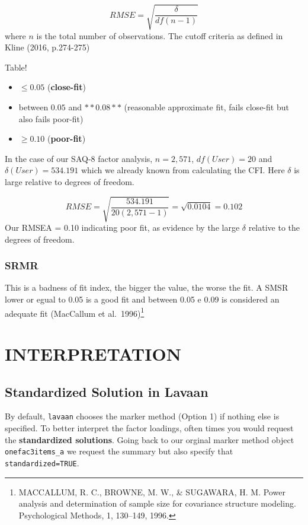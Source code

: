 \documentclass[
]{article}
\providecommand{\tightlist}{%
  \setlength{\itemsep}{0pt}\setlength{\parskip}{0pt}}
\begin{document}
\[
RMSE = \sqrt{\frac{\delta}{df(n-1)}}
\] where \(n\) is the total number of observations. The cutoff criteria
as defined in Kline (2016, p.274-275)

Table!

\begin{itemize}
\tightlist
\item
  \(\leq 0.05\) (\textbf{close-fit})
\item
  between \(0.05\) and \(**0.08**\) (reasonable approximate fit, fails
  close-fit but also fails poor-fit)
\item
  \(\geq 0.10\) (\textbf{poor-fit})
\end{itemize}

In the case of our SAQ-8 factor analysis, \(n=2,571\), \(df(User)=20\)
and \(\delta (User)=534.191\) which we already known from calculating
the CFI. Here \(\delta\) is large relative to degrees of freedom.

\[
RMSE = \sqrt{\frac{534.191}{20(2,571-1)}}=\sqrt{0.0104}=0.102
\] Our RMSEA = 0.10 indicating poor fit, as evidence by the large
\(\delta\) relative to the degrees of freedom.

\hypertarget{srmr}{%
\subsubsection{SRMR}\label{srmr}}

This is a badness of fit index, the bigger the value, the worse the fit.
A SMSR lower or egual to 0.05 is a good fit and between 0.05 e 0.09 is
considered an adequate fit (MacCallum et al.~1996)\footnote{MACCALLUM,
  R. C., BROWNE, M. W., \& SUGAWARA, H. M. Power analysis and
  determination of sample size for covariance structure modeling.
  Psychological Methods, 1, 130--149, 1996.}

\hypertarget{interpretation}{%
\section{INTERPRETATION}\label{interpretation}}

\hypertarget{standardized-solution-in-lavaan}{%
\subsection{Standardized Solution in
Lavaan}\label{standardized-solution-in-lavaan}}

By default, \texttt{lavaan} chooses the marker method (Option 1) if
nothing else is specified. To better interpret the factor loadings,
often times you would request the \textbf{standardized solutions}. Going
back to our orginal marker method object \texttt{onefac3items\_a} we
request the summary but also specify that \texttt{standardized=TRUE}.
\end{document}
